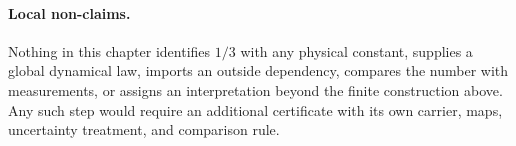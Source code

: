 \paragraph{Local non-claims.}
Nothing in this chapter identifies $1/3$ with any physical constant, supplies a global dynamical law, imports an outside dependency, compares the number with measurements, or assigns an interpretation beyond the finite construction above.  Any such step would require an additional certificate with its own carrier, maps, uncertainty treatment, and comparison rule.